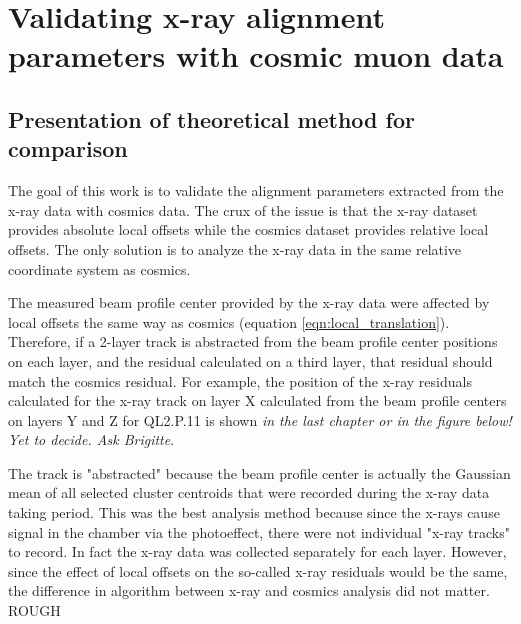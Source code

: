 
\chapter{Validating x-ray alignment parameters with cosmic muon data}
\label{chap:comparison}

\section{Presentation of theoretical method for comparison}

The goal of this work is to validate the alignment parameters extracted from the x-ray data with cosmics data. The crux of the issue is that the x-ray dataset provides absolute local offsets while the cosmics dataset provides relative local offsets. The only solution is to analyze the x-ray data in the same relative coordinate system as cosmics.

The measured beam profile center provided by the x-ray data were affected by local offsets the same way as cosmics (equation \ref{eqn:local_translation}). Therefore, if a 2-layer track is abstracted from the beam profile center positions on each layer, and the residual calculated on a third layer, that residual should match the cosmics residual. For example, the position of the x-ray residuals calculated for the x-ray track on layer X calculated from the beam profile centers on layers Y and Z for QL2.P.11 is shown \textit{in the last chapter or in the figure below! Yet to decide. Ask Brigitte}. 


The track is "abstracted" because the beam profile center is actually the Gaussian mean of all selected cluster centroids that were recorded during the x-ray data taking period. This was the best analysis method because since the x-rays cause signal in the chamber via the photoeffect, there were not individual "x-ray tracks" to record. In fact the x-ray data was collected separately for each layer. However, since the effect of local offsets on the so-called x-ray residuals would be the same, the difference in algorithm between x-ray and cosmics analysis did not matter. 
ROUGH

